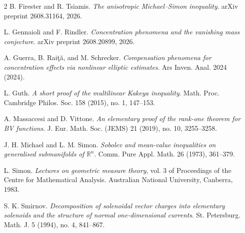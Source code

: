 \documentclass[11pt,a4paper]{amsart}
\newcommand{\R}{\mathbb{R}}
\theoremstyle{definition}
\begin{document}
\begin{thebibliography}{2}
 B. Firester and R. Tsiamis.
\emph{The anisotropic Michael--Simon inequality}.
arXiv preprint 2608.31164, 2026.

 L. Gennaioli and F. Rindler.
\emph{Concentration phenomena and the vanishing mass conjecture}.
arXiv preprint 2608.20899, 2026.

 A. Guerra, B. Rai{\c{t}}{\u{a}}, and M. Schrecker.
 \emph{Compensation phenomena for concentration effects via nonlinear elliptic estimates}.
 Ars Inven. Anal. 2024 (2024).

 L. Guth.
\emph{A short proof of the multilinear Kakeya inequality}.
Math. Proc. Cambridge Philos. Soc. 158 (2015), no. 1, 147--153. 

A. Massaccesi and D. Vittone.
\emph{An elementary proof of the rank-one theorem for BV functions}.
J. Eur. Math. Soc. (JEMS) 21 (2019), no. 10, 3255--3258. 

 J. H. Michael and L. M. Simon.
\emph{Sobolev and mean-value inequalities on generalised submanifolds of $\R^n$}.
Comm. Pure Appl. Math. 26 (1973), 361--379.

 L. Simon. \emph{Lectures on geometric measure theory}, vol. 3 of Proceedings of the Centre
for Mathematical Analysis. Australian National University, Canberra, 1983.

 S. K. Smirnov.
\emph{Decomposition of solenoidal vector charges into elementary solenoids and the structure of normal one-dimensional currents}.
St. Petersburg. Math. J. 5 (1994), no. 4, 841--867.

\end{thebibliography}
\end{document}
